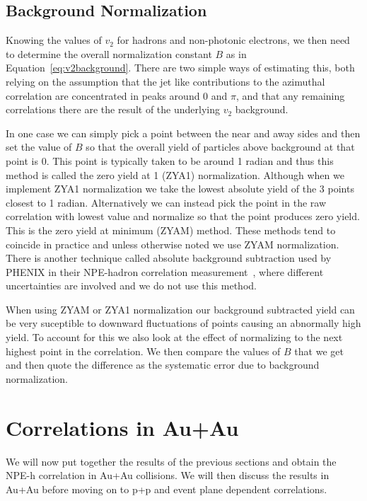 \subsection{Background Normalization}

Knowing the values of $v_2$ for hadrons and non-photonic electrons, we then need to determine the overall normalization constant $B$ as in Equation~\ref{eq:v2background}. There are two simple ways of estimating this, both relying on the assumption that the jet like contributions to the azimuthal correlation are concentrated in peaks around 0 and $\pi$, and that any remaining correlations there are the result of the underlying $v_2$ background. 

In one case we can simply pick a point between the near and away sides and then set the value of $B$ so that the overall yield of particles above background at that point is 0. This point is typically taken to be around 1 radian and thus this method is called the zero yield at 1 (ZYA1) normalization. Although when we implement ZYA1 normalization we take the lowest absolute yield of the 3 points closest to 1 radian. Alternatively we can instead pick the point in the raw correlation with lowest value and normalize so that the point produces zero yield. This is the zero yield at minimum (ZYAM) method. These methods tend to coincide in practice and unless otherwise noted we use ZYAM normalization. There is another technique called absolute background subtraction used by PHENIX in their NPE-hadron correlation measurement~\cite{PHENIXeh}, where different uncertainties are involved and we do not use this method. 

When using ZYAM or ZYA1 normalization our background subtracted yield can be very suceptible to downward fluctuations of points causing an abnormally high yield. To account for this we also look at the effect of normalizing to the next highest point in the correlation. We then compare the values of $B$ that we get and then quote the difference as the systematic error due to background normalization.

\section{Correlations in Au+Au}

We will now put together the results of the previous sections and obtain the NPE-h correlation in Au+Au collisions. We will then discuss the results in Au+Au before moving on to p+p and event plane dependent correlations.

